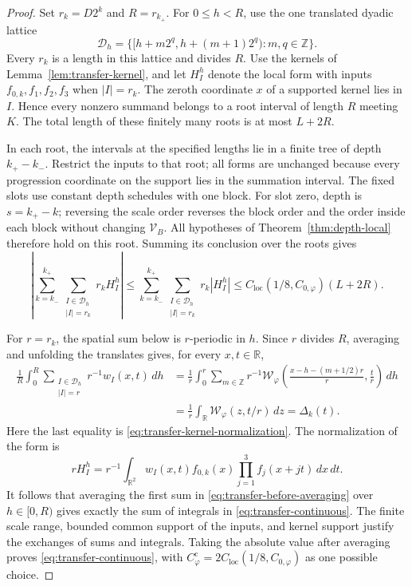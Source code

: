 \begin{proof}
Set \(r_k=D2^k\) and \(R=r_{k_+}\).  For \(0\leq h<R\), use the one
translated dyadic lattice
\[
 \mathcal D_h
   =\{[h+m2^q,h+(m+1)2^q):m,q\in\mathbb Z\}.
\]
Every \(r_k\) is a length in this lattice and divides \(R\).
Use the kernels of Lemma~\ref{lem:transfer-kernel}, and let \(H_I^h\)
denote the local form with inputs \(f_{0,k},f_1,f_2,f_3\) when
\(|I|=r_k\).  The zeroth coordinate \(x\) of a supported kernel lies
in \(I\).  Hence every nonzero summand belongs to a root interval of
length \(R\) meeting \(K\).  The total length of these finitely many
roots is at most \(L+2R\).

In each root, the intervals at the specified lengths lie in a finite
tree of depth \(k_+-k_-\).  Restrict the inputs to that root; all forms
are unchanged because every progression coordinate on the support lies
in the summation interval.  The fixed slots use constant depth
schedules with one block.  For slot zero, depth is \(s=k_+-k\);
reversing the scale order reverses the block order and the order inside
each block without changing \(\mathcal V_B\).  All hypotheses of
Theorem~\ref{thm:depth-local} therefore hold on this root.  Summing its
conclusion over the roots gives
\begin{equation}
 \left|\sum_{k=k_-}^{k_+}
       \sum_{\substack{I\in\mathcal D_h\\|I|=r_k}}r_kH_I^h\right|
 \leq\sum_{k=k_-}^{k_+}
       \sum_{\substack{I\in\mathcal D_h\\|I|=r_k}}r_k|H_I^h|
 \leq C_{\mathrm{loc}}(1/8,C_{0,\varphi})(L+2R).
 \label{eq:transfer-before-averaging}
\end{equation}

For \(r=r_k\), the spatial sum below is \(r\)-periodic in \(h\).
Since \(r\) divides \(R\), averaging and unfolding the translates gives,
for every \(x,t\in\mathbb R\),
\begin{align*}
 \frac1R\int_0^R
    \sum_{\substack{I\in\mathcal D_h\\|I|=r}}r^{-1}w_I(x,t)\,dh
 &=\frac1r\int_0^r\sum_{m\in\mathbb Z}r^{-1}
      \mathcal W_\varphi\left(
        \frac{x-h-(m+1/2)r}{r},\frac{t}{r}\right)\,dh\\
 &=\frac1r\int_{\mathbb R}\mathcal W_\varphi(z,t/r)\,dz
   =\Delta_k(t).
\end{align*}
Here the last equality is \eqref{eq:transfer-kernel-normalization}.
The normalization of the form is
\[
 rH_I^h=r^{-1}\int_{\mathbb R^2}
      w_I(x,t)f_{0,k}(x)\prod_{j=1}^3f_j(x+jt)\,dx\,dt.
\]
It follows that averaging the first sum in
\eqref{eq:transfer-before-averaging} over \(h\in[0,R)\) gives exactly
the sum of integrals in \eqref{eq:transfer-continuous}.  The finite
scale range, bounded common support of the inputs, and kernel support
justify the exchanges of sums and integrals.  Taking the absolute value
after averaging proves \eqref{eq:transfer-continuous}, with
\(C_\varphi^{\mathrm c}=2C_{\mathrm{loc}}(1/8,C_{0,\varphi})\) as one
possible choice.
\end{proof}

